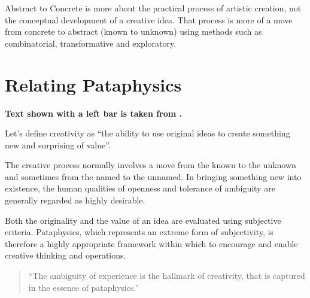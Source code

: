 \begin{draft}
  Abstract to Concrete is more about the practical process of artistic creation, not the conceptual development of a creative idea. That process is more of a move from concrete to abstract (known to unknown) using methods such as combinatorial, transformative and exploratory.
\end{draft}


\section{Relating Pataphysics}

\textbf{Text shown with a left bar is taken from \autocite{Hugill2013d}.}

Let's define creativity as ``the ability to use original ideas to create something new and surprising of value''.

\begin{leftbar}
The creative process normally involves a move from the known to the unknown and sometimes from the named to the unnamed. In bringing something new into existence, the human qualities of openness and tolerance of ambiguity are generally regarded as highly desirable.
\end{leftbar}

\begin{leftbar}
Both the originality and the value of an idea are evaluated using subjective criteria. Pataphysics, which represents an extreme form of subjectivity, is therefore a highly appropriate framework within which to encourage and enable creative thinking and operations.
\end{leftbar}

\begin{quote}
  ``The ambiguity of experience is the hallmark of creativity, that is captured in the essence of pataphysics.'' \autocite{Hendler2013}
\end{quote}



